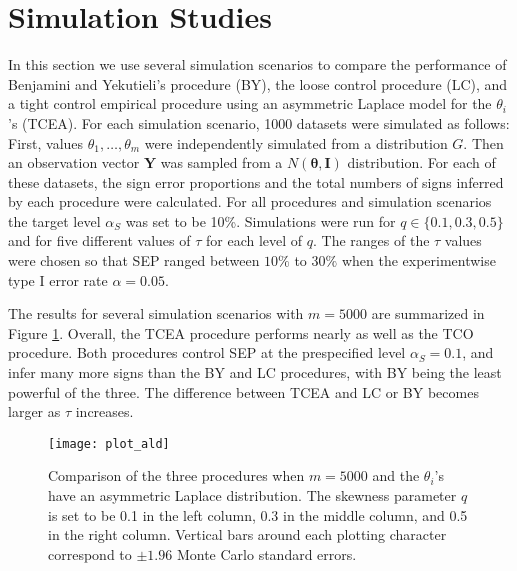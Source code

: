 \documentclass[11pt]{article}
\begin{document}
\section{Simulation Studies}
In this section we use several simulation scenarios to compare the performance of Benjamini and Yekutieli's procedure (BY), the loose control  procedure (LC), 
and a tight control empirical procedure using an asymmetric Laplace model
  for the $\theta_i$'s (TCEA). 
For each simulation scenario, 1000 datasets were simulated as follows:
First, values  $\theta_1,\ldots, \theta_m$ were independently simulated 
from a  distribution $G$. 
Then an observation vector  $\boldsymbol{Y}$ was sampled from a $N(\boldsymbol{\theta},\boldsymbol{I})$ distribution. 
For each of these datasets, the sign error proportions 
and the total numbers of signs inferred by each procedure were calculated. 
For all procedures and simulation scenarios  the target level $\alpha_S$  was set to be 10\%.
Simulations were run for $q \in \{0.1, 0.3, 0.5\}$ and for five different values of $\tau$ for each level of $q$. The ranges of the $\tau$ values were chosen so that SEP ranged between   $10 \%$ to $30\%$ when the  experimentwise type I error rate $\alpha = 0.05$.

The results 
for several simulation scenarios with $m=5000$ 
are summarized in Figure \ref{fig:ald}. Overall, the TCEA procedure performs nearly as well as the TCO procedure. Both procedures control SEP at the prespecified level $\alpha_S = 0.1$, and infer many more signs than the BY and LC procedures, with BY being the least powerful of the three. The difference between TCEA and LC or BY becomes larger as $\tau$ increases. 

\begin{figure}[!h]
	\centering
	\texttt{[image: plot\_ald]}
	\caption{Comparison of the three procedures when $m=5000$ and the $\theta_i$'s have an asymmetric Laplace  distribution.  The skewness parameter $q$ is set to be 0.1 in the left column, 0.3 in the middle column, and 0.5 in the right column. Vertical bars around each plotting character correspond to $\pm 1.96$ Monte Carlo standard errors. }
	\label{fig:ald}
\end{figure}
\end{document}
